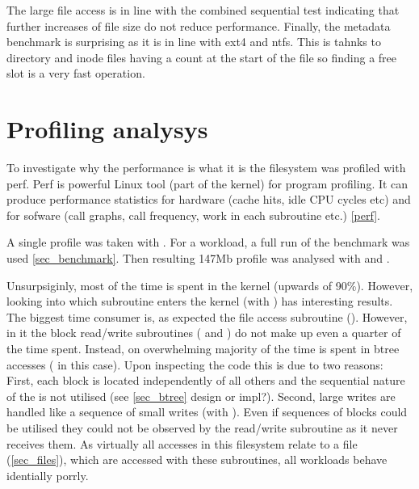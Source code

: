         The large file access is in line with the combined sequential test
        indicating that further increases of file size do not reduce
        performance. Finally, the metadata benchmark is surprising as it is in
        line with ext4 and ntfs. This is tahnks to directory and inode files
        having a count at the start of the file so finding a free slot is a
        very fast operation.

    \section{Profiling analysys}
        \label{sec_perf}

        To investigate why the performance is what it is the filesystem was
        profiled with perf. Perf is powerful Linux tool (part of the kernel)
        for program profiling. It can produce performance statistics for
        hardware (cache hits, idle CPU cycles etc) and for sofware (call
        graphs, call frequency, work in each subroutine etc.) \ref{perf}.

        A single profile was taken with . For a workload, a full run of the benchmark was used
        \ref{sec_benchmark}. Then resulting 147Mb profile was analysed with
         and .

        Unsurpsiginly, most of the time is spent in the kernel (upwards of
        90\%). However, looking into which subroutine enters the kernel (with
        ) has interesting results. The biggest time
        consumer is, as expected the file access subroutine
        ().  However, in it the block
        read/write subroutines ( and
        ) do not make up even a quarter of the time
        spent. Instead, on overwhelming majority of the time is spent in btree
        accesses ( in this case). Upon inspecting
        the code this is due to two reasons: First, each block is located
        independently of all others and the sequential nature of the \bplustree
        is not utilised (see \ref{sec_btree} design or impl?). Second, large
        writes are handled like a sequence of small writes (with
        ). Even if sequences of blocks could
        be utilised they could not be observed by the read/write subroutine as
        it never receives them. As virtually all accesses in this filesystem
        relate to a file (\ref{sec_files}), which are accessed with these
        subroutines, all workloads behave identially porrly.

